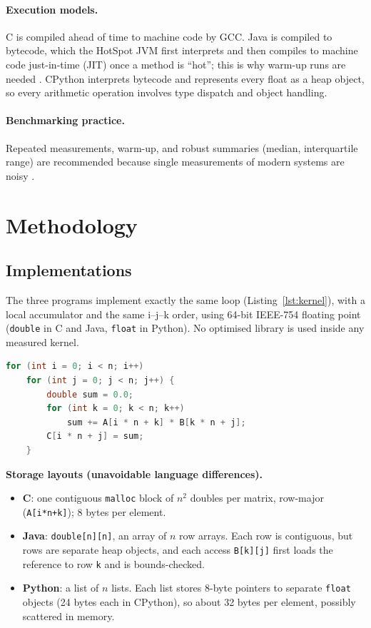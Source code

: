 \documentclass[11pt,a4paper]{article}
\begin{document}
\paragraph{Execution models.} C is compiled ahead of time to machine code by GCC.
Java is compiled to bytecode, which the HotSpot JVM first interprets and then
compiles to machine code just-in-time (JIT) once a method is ``hot''; this is why
warm-up runs are needed \cite{georges}. CPython interprets bytecode and represents every
float as a heap object, so every arithmetic operation involves type dispatch and object
handling.

\paragraph{Benchmarking practice.} Repeated measurements, warm-up, and robust summaries
(median, interquartile range) are recommended because single measurements of modern
systems are noisy \cite{georges, kalibera}.

\needspace{0.3\textheight}
\section{Methodology}

\subsection{Implementations}
The three programs implement exactly the same loop (Listing~\ref{lst:kernel}), with a
local accumulator and the same i--j--k order, using 64-bit IEEE-754 floating point
(\texttt{double} in C and Java, \texttt{float} in Python). No optimised library is used
inside any measured kernel.

\begin{lstlisting}[language=C, caption={Kernel shared by the three implementations (C version).}, label={lst:kernel}]
for (int i = 0; i < n; i++)
    for (int j = 0; j < n; j++) {
        double sum = 0.0;
        for (int k = 0; k < n; k++)
            sum += A[i * n + k] * B[k * n + j];
        C[i * n + j] = sum;
    }
\end{lstlisting}

\noindent\textbf{Storage layouts (unavoidable language differences).}
\begin{itemize}
  \item \textbf{C}: one contiguous \texttt{malloc} block of $n^2$ doubles per matrix,
        row-major (\texttt{A[i*n+k]}); 8 bytes per element.
  \item \textbf{Java}: \texttt{double[n][n]}, an array of $n$ row arrays. Each row is
        contiguous, but rows are separate heap objects, and each access \texttt{B[k][j]}
        first loads the reference to row \texttt{k} and is bounds-checked.
  \item \textbf{Python}: a list of $n$ lists. Each list stores 8-byte pointers to
        separate \texttt{float} objects (24 bytes each in CPython), so about 32 bytes
        per element, possibly scattered in memory.
\end{itemize}
\end{document}
